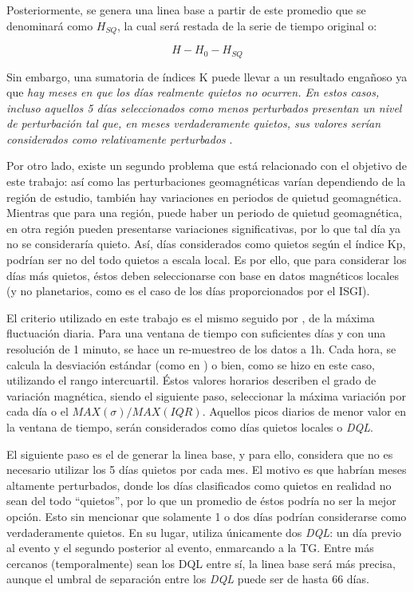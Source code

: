 Posteriormente, se genera una linea base a partir de este promedio que se denominará como $H_{SQ}$, la cual será restada de la serie de tiempo original o:
\vspace{1 em}

\begin{equation}
\label{eq:lineabase}
    H- H_0-H_{SQ}
\end{equation}

Sin embargo, una sumatoria de índices K puede llevar a un resultado engañoso ya que \textit{hay meses en que los días realmente quietos no ocurren. En estos casos, incluso aquellos 5 días seleccionados como menos perturbados presentan un nivel de perturbación tal que, en meses verdaderamente quietos, sus valores serían considerados como relativamente perturbados} \parencite{BARTELS_kp}.
\vspace{1 em}

Por otro lado, existe un segundo problema que está relacionado con el objetivo de este trabajo: así como las perturbaciones geomagnéticas varían dependiendo de la región de estudio, también hay variaciones en periodos de quietud geomagnética. Mientras que para una región, puede haber un periodo de quietud geomagnética, en otra región pueden presentarse variaciones significativas, por lo que tal día ya no se consideraría quieto. Así, días considerados como quietos según el índice Kp, podrían ser no del todo quietos a escala local. Es por ello, que para considerar los días más quietos, éstos deben seleccionarse con base en datos magnéticos locales (y no planetarios, como es el caso de los días proporcionados por el ISGI). 
\vspace{1 em}

El criterio utilizado en este trabajo es el mismo seguido por \cite{baseline_Gjerloev, vanKampt}, de la máxima fluctuación diaria. Para una ventana de tiempo con suficientes días y con una resolución de 1 minuto, se hace un re-muestreo de los datos a 1h. Cada hora, se calcula la desviación estándar (como en \cite{vanKampt}) o bien, como se hizo en este caso, utilizando el rango intercuartil. Éstos valores horarios describen el grado de variación magnética, siendo el siguiente paso, seleccionar la máxima variación por cada día o el $MAX(\sigma)/MAX(IQR)$. Aquellos picos diarios de menor valor en la ventana de tiempo, serán considerados como días quietos locales o \emph{DQL}.
\vspace{1 em}

El siguiente paso es el de generar la linea base, y para ello, \cite{vanKampt} considera que no es necesario utilizar los 5 días quietos por cada mes. El motivo es que habrían meses altamente perturbados, donde los días clasificados como quietos en realidad no sean del todo ``quietos'', por lo que un promedio de éstos podría no ser la mejor opción. Esto sin mencionar que solamente 1 o dos días podrían considerarse como verdaderamente quietos. En su lugar, \cite{vanKampt} utiliza únicamente dos \emph{DQL}: un día previo al evento y el segundo posterior al evento, enmarcando a la TG. Entre más cercanos (temporalmente) sean los DQL entre sí, la linea base será más precisa, aunque el umbral de separación entre los \emph{DQL} puede ser de hasta 66 días.
\vspace{1 em}

